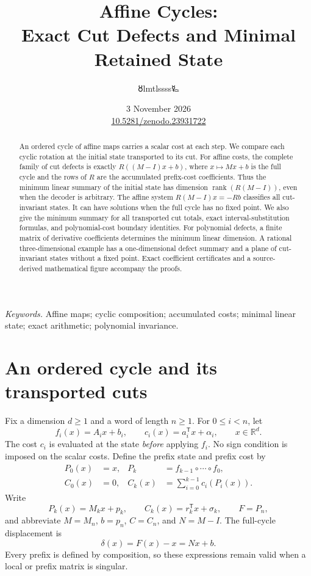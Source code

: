\documentclass[11pt,a4paper]{article}
\title{\LARGE Affine Cycles:\\Exact Cut Defects and Minimal Retained State}
\author{{\authorsymbol 🜘}lmtlssss{\authorsymbol 🜐}}
\date{3 November 2026\\[3pt]\small\href{https://doi.org/10.5281/zenodo.23931722}{10.5281/zenodo.23931722}}
\theoremstyle{definition}\newtheorem{definition}[theorem]{Definition}\newtheorem{example}[theorem]{Example}\newtheorem{remark}[theorem]{Remark}
\DeclareMathOperator{\rank}{rank}\DeclareMathOperator{\im}{im}\DeclareMathOperator{\spanop}{span}\DeclareMathOperator{\diag}{diag}
\newcommand{\R}{\mathbb R}\newcommand{\Q}{\mathbb Q}\newcommand{\Z}{\mathbb Z}\newcommand{\N}{\mathbb N}\newcommand{\id}{\mathrm{id}}
\begin{document}
\maketitle\thispagestyle{plain}

\begin{abstract}
An ordered cycle of affine maps carries a scalar cost at each step. We
compare each cyclic rotation at the initial state transported to its cut.
For affine costs, the complete family of cut defects is exactly
$R((M-I)x+b)$, where $x\mapsto Mx+b$ is the full cycle and the rows of
$R$ are the accumulated prefix-cost coefficients. Thus the minimum
linear summary of the initial state has dimension $\rank(R(M-I))$,
even when the decoder is arbitrary. The affine system
$R(M-I)x=-Rb$ classifies all cut-invariant states. It can have solutions
when the full cycle has no fixed point. We also give the minimum summary
for all transported cut totals, exact interval-substitution formulas,
and polynomial-cost boundary identities. For polynomial defects,
a finite matrix of derivative coefficients determines the minimum
linear dimension. A rational three-dimensional example has a
one-dimensional defect summary and a plane of cut-invariant states
without a fixed point. Exact coefficient certificates and a
source-derived mathematical figure accompany the proofs.
\end{abstract}
\noindent\textit{Keywords.} Affine maps; cyclic composition; accumulated
costs; minimal linear state; exact arithmetic; polynomial invariance.

\section{An ordered cycle and its transported cuts}
Fix a dimension $d\ge1$ and a word of length $n\ge1$. For
$0\le i<n$, let
\[
 f_i(x)=A_i x+b_i,\qquad c_i(x)=a_i^{\mathsf T}x+\alpha_i,
 \qquad x\in\R^d.
\]
The cost $c_i$ is evaluated at the state \emph{before} applying $f_i$.
No sign condition is imposed on the scalar costs. Define the prefix
state and prefix cost by
\begin{equation}\label{eq:prefix}
 \begin{aligned}
 P_0(x)&=x,&P_k&=f_{k-1}\circ\cdots\circ f_0,\\
 C_0(x)&=0,&C_k(x)&=\sum_{i=0}^{k-1}c_i(P_i(x)).
 \end{aligned}
\end{equation}
Write
\[
 P_k(x)=M_kx+p_k,\qquad C_k(x)=r_k^{\mathsf T}x+\sigma_k,
 \qquad F=P_n,
\]
and abbreviate $M=M_n$, $b=p_n$, $C=C_n$, and
$N=M-I$. The full-cycle displacement is
\begin{equation}\label{eq:displacement}
 \delta(x)=F(x)-x=Nx+b.
\end{equation}
Every prefix is defined by composition, so these expressions remain
valid when a local or prefix matrix is singular.
\end{document}
